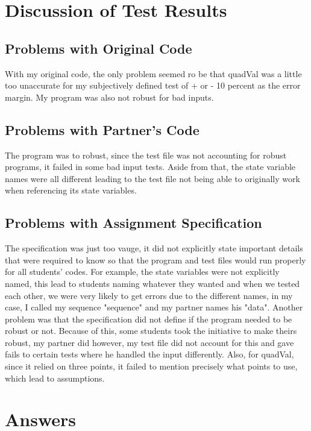 \documentclass[12pt]{article}
\begin{document}
\section{Discussion of Test Results}

\subsection{Problems with Original Code}
With my original code, the only problem seemed ro be that quadVal was a little 
too unaccurate for my subjectively defined test of + or - 10 percent as the
error margin. My program was also not robust for bad inputs.

\subsection{Problems with Partner's Code}
The program was to robust, since the test file was not accounting for robust
programs, it failed in some bad input tests. Aside from that, the state variable
names were all different leading to the test file not being able to originally work 
when referencing its state variables.
\subsection{Problems with Assignment Specification}
The specification was just too vauge, it did not explicitly state important details
that were required to know so that the program and test files would run properly for
all students' codes. For example, the state variables were not explicitly named, this
lead to students naming whatever they wanted and when we tested each other, we were
very likely to get errors due to the different names, in my case, I called my sequence
"sequence" and my partner names his "data". Another problem was that the specification 
did not define if the program needed to be robust or not. Because of this, some students
took the initiative to make theirs robust, my partner did however, my test file
did not account for this and gave fails to certain tests where he handled the input 
differently. Also, for quadVal, since it relied on three points, it failed to mention
precisely what points to use, which lead to assumptions.
\section{Answers}
\end{document}
